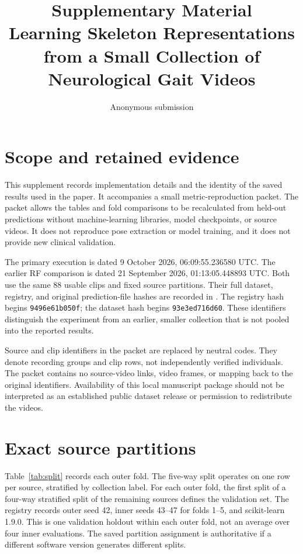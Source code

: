 \documentclass[10pt,twocolumn,letterpaper]{article}
\title{Supplementary Material\\Learning Skeleton Representations from a Small Collection of Neurological Gait Videos}
\author{Anonymous submission}
\begin{document}
\maketitle

\section{Scope and retained evidence}
This supplement records implementation details and the identity of the saved results used in the paper. It accompanies a small metric-reproduction packet. The packet allows the tables and fold comparisons to be recalculated from held-out predictions without machine-learning libraries, model checkpoints, or source videos. It does not reproduce pose extraction or model training, and it does not provide new clinical validation.

The primary execution is dated 9 October 2026, 06:09:55.236580 UTC. The earlier RF comparison is dated 21 September 2026, 01:13:05.448893 UTC. Both use the same 88 usable clips and fixed source partitions. Their full dataset, registry, and original prediction-file hashes are recorded in . The registry hash begins \texttt{9496e61b050f}; the dataset hash begins \texttt{93e3ed716d60}. These identifiers distinguish the experiment from an earlier, smaller collection that is not pooled into the reported results.

Source and clip identifiers in the packet are replaced by neutral codes. They denote recording groups and clip rows, not independently verified individuals. The packet contains no source-video links, video frames, or mapping back to the original identifiers. Availability of this local manuscript package should not be interpreted as an established public dataset release or permission to redistribute the videos.

\section{Exact source partitions}
Table~\ref{tab:split} records each outer fold. The five-way split operates on one row per source, stratified by collection label. For each outer fold, the first split of a four-way stratified split of the remaining sources defines the validation set. The registry records outer seed 42, inner seeds 43--47 for folds 1--5, and scikit-learn 1.9.0. This is one validation holdout within each outer fold, not an average over four inner evaluations. The saved partition assignment is authoritative if a different software version generates different splits.
\end{document}
